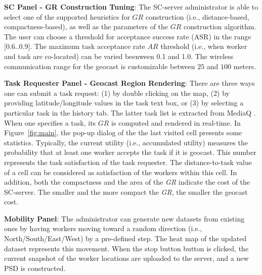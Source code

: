 \documentclass{USC-Thesis}
\numberwithin{equation}{chapter}
\begin{document}
\textbf{SC Panel - GR Construction Tuning}: The SC-server administrator is able to select one of the supported heuristics for $GR$ construction (i.e., distance-based, compactness-based), as well as the parameters of the $\mathit{GR}$ construction algorithm.
The user can choose a threshold for acceptance success rate (ASR) in the range [0.6..0.9]. The maximum task acceptance rate $\mathit{AR}$ threshold (i.e., when worker and task are co-located) can be varied beenween 0.1 and 1.0. The wireless communication range for the geocast is customizable between $25$ and $100$ meters. 

\textbf{Task Requester Panel - Geocast Region Rendering}: There are three ways one can submit a task request: (1) by double clicking on the map, (2) by providing latitude/longitude values in the task text box, or (3) by selecting a particular task in the history tab. The latter task list is extracted from MediaQ \cite{kim2014mediaq}. When one specifies a task, its $\mathit{GR}$ is computed and rendered in real-time. In Figure~\ref{fig:main}, the pop-up dialog of the the last visited cell presents some statistics. Typically, the current utility (i.e., accumulated utility) measures the probability that at least one worker accepts the task if it is geocast. This number represents the task satisfaction of the task requester. The distance-to-task value of a cell can be considered as satisfaction of the workers within this cell. In addition, both the compactness and the area of the {\em GR} indicate the cost of the SC-server. The smaller and the more compact the {\em GR}, the smaller the geocast cost.

\textbf{Mobility Panel}: The administrator can generate new datasets from existing ones by having workers moving toward a random direction (i.e., North/South/East/West) by a pre-defined step. The heat map of the updated dataset represents this movement. When the stop button button is clicked, the current snapshot of the worker locations are uploaded to the server, and a new PSD is constructed.

\end{document}
